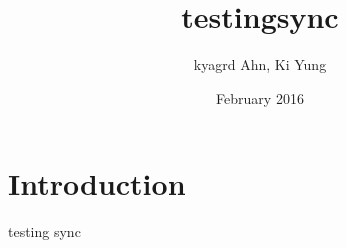 \documentclass{article}
\title{testingsync}
\author{kyagrd Ahn, Ki Yung}
\date{February 2016}
\begin{document}
\maketitle

\section{Introduction}
testing sync
\end{document}
